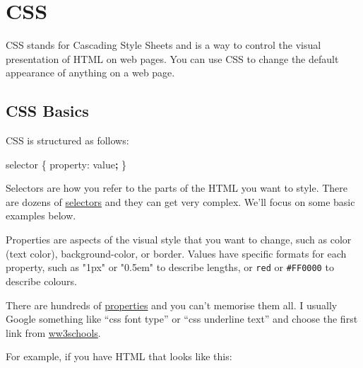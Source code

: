 \documentclass[
  oneside]{book}
\newenvironment{Shaded}{\begin{snugshade}}{\end{snugshade}}
\newcommand{\NormalTok}[1]{#1}
\newcommand{\OperatorTok}[1]{\textcolor[rgb]{0.81,0.36,0.00}{\textbf{#1}}}
\newcommand{\StringTok}[1]{\textcolor[rgb]{0.31,0.60,0.02}{#1}}
\begin{document}
\hypertarget{CSS}{%
\section{CSS}\label{CSS}}

CSS stands for Cascading Style Sheets and is a way to control the visual presentation of HTML on web pages. You can use CSS to change the default appearance of anything on a web page.

\hypertarget{css-basics}{%
\subsection{CSS Basics}\label{css-basics}}

CSS is structured as follows:

\begin{Shaded}
\begin{Highlighting}[]
\NormalTok{selector \{ property: value}\OperatorTok{;}\NormalTok{ \}}
\end{Highlighting}
\end{Shaded}

Selectors are how you refer to the parts of the HTML you want to style. There are dozens of \href{https://www.w3schools.com/cssref/css_selectors.asp}{selectors} and they can get very complex. We'll focus on some basic examples below.

Properties are aspects of the visual style that you want to change, such as \NormalTok{color} (text color), \NormalTok{background-color}, or \NormalTok{border}. Values have specific formats for each property, such as \StringTok{"1px"} or \StringTok{"0.5em"} to describe lengths, or \texttt{red} or \texttt{\#FF0000} to describe colours.

\begin{info}
There are hundreds of \href{https://www.w3schools.com/cssref/default.asp}{properties} and you can't memorise them all. I usually Google something like ``css font type'' or ``css underline text'' and choose the first link from \href{https://www.w3schools.com}{ww3schools}.

\end{info}

For example, if you have HTML that looks like this:
\end{document}
